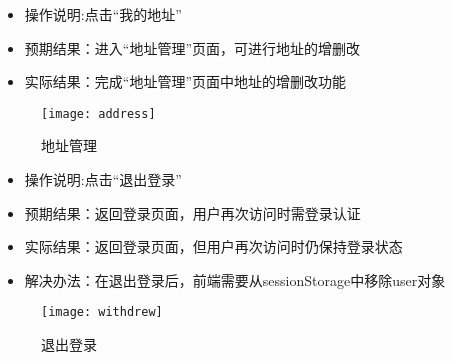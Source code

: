 \begin{enumerate}
\begin{figure}[htbp]
          \end{figure}
          \begin{itemize}
              \item{操作说明}:点击“我的地址”
              \item {预期结果}：进入“地址管理”页面，可进行地址的增删改
              \item {实际结果}：完成“地址管理”页面中地址的增删改功能
          \end{itemize}
          \begin{figure}[htbp]
              \centering
              \texttt{[image: address]}
              \caption{地址管理}\label{fig:address}
          \end{figure}
          \begin{itemize}
              \item{操作说明}:点击“退出登录”
              \item {预期结果}：返回登录页面，用户再次访问时需登录认证
              \item {实际结果}：返回登录页面，但用户再次访问时仍保持登录状态
              \item {解决办法}：在退出登录后，前端需要从sessionStorage中移除user对象
          \end{itemize}
          \begin{figure}[htbp]
              \centering
              \texttt{[image: withdrew]}
              \caption{退出登录}\label{fig:withdrew}
          \end{figure}

\end{enumerate}

